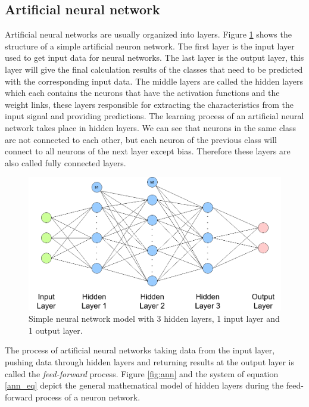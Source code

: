 \documentclass[conference]{IEEEtran}
\begin{document}
\subsection{Artificial neural network}
Artificial neural networks are usually organized into layers. Figure \ref{fig:nn} shows the structure of a simple artificial neuron network. The first layer is the input layer used to get input data for neural networks. The last layer is the output layer, this layer will give the final calculation results of the classes that need to be predicted with the corresponding input data. The middle layers are called the hidden layers which each contains the neurons that have the activation functions and the weight links, these layers responsible for extracting the characteristics from the input signal and providing predictions. The learning process of an artificial neural network takes place in hidden layers. We can see that neurons in the same class are not connected to each other, but each neuron of the previous class will connect to all neurons of the next layer except bias. Therefore these layers are also called fully connected layers.
\begin{figure}[ht]
	\centerline{\includegraphics[scale=0.2]{images/nn.png}}
  	\caption{Simple neural network model with 3 hidden layers, 1 input layer and 1 output layer.}
  	\label{fig:nn}
\end{figure}
The process of artificial neural networks taking data from the input layer, pushing data through hidden layers and returning results at the output layer is called the \emph{feed-forward} process. Figure \ref{fig:ann} and the system of equation \ref{ann_eq} depict the general mathematical model of hidden layers during the feed-forward process of a neuron network.
\end{document}
